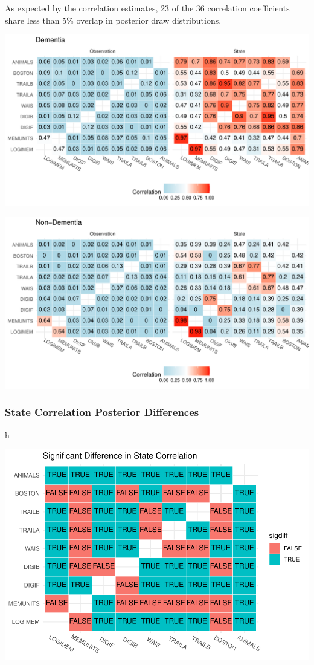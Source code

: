 \documentclass[
]{article}
\begin{document}
As expected by the correlation estimates, 23 of the 36 correlation coefficients share less than 5\% overlap in posterior draw distributions.

\includegraphics{Master_files/figure-latex/unnamed-chunk-38-1.pdf}

\includegraphics{Master_files/figure-latex/unnamed-chunk-40-1.pdf}

\hypertarget{state-correlation-posterior-differences}{%
\subsubsection{State Correlation Posterior Differences}\label{state-correlation-posterior-differences}}

h

\includegraphics{Master_files/figure-latex/unnamed-chunk-42-1.pdf}
\end{document}
